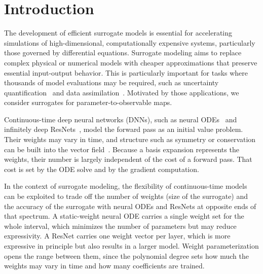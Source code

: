 \documentclass[pdflatex,sn-mathphys-num]{sn-jnl}%
\theoremstyle{thmstyleone}%
\theoremstyle{thmstyletwo}%
\theoremstyle{thmstylethree}%
\begin{document}

\maketitle

\section{Introduction}\label{sec1}
The development of efficient surrogate models is essential for accelerating simulations of high-dimensional, computationally expensive systems, particularly those governed by differential equations.
%
Surrogate modeling aims to replace complex physical or numerical models with cheaper approximations that preserve essential input-output behavior.
%
This is particularly important for tasks where thousands of model evaluations may be required, such as uncertainty quantification~\cite{benner2015survey, olearyroseberry2022dipnets} and data assimilation~\cite{IglesiasLawStuart2013}.
%
Motivated by those applications, we consider  surrogates for parameter-to-observable maps. 

Continuous-time deep neural networks (DNNs), such as neural ODEs~\cite{ChenEtAl2018} and infinitely deep  ResNets~\cite{E:2017kz, HaberRuthotto2017, ruthotto2024differential}, model the forward pass as an initial value problem.
%
Their weights may vary in time, and structure such as symmetry or conservation can be built into the vector field~\cite{HaberRuthotto2017, zhong2019symplectic}.
%
Because a basis expansion represents the weights, their number is largely independent of the cost of a forward pass.
%
That cost is set by the ODE solve and by the gradient computation.

In the context of surrogate modeling, the flexibility of continuous-time models can be exploited to trade off the number of weights (size of the surrogate) and the accuracy of the surrogate with neural ODEs and ResNets at opposite ends of that spectrum.
%
A static-weight neural ODE carries a single weight set for the whole interval, which minimizes the number of parameters but may reduce expressivity.
%
A ResNet carries one weight vector per layer, which is more expressive in principle but also results in a larger model.
%
Weight parameterization opens the range between them, since the polynomial degree sets how much the weights may vary in time and how many coefficients are trained.
%
\end{document}
